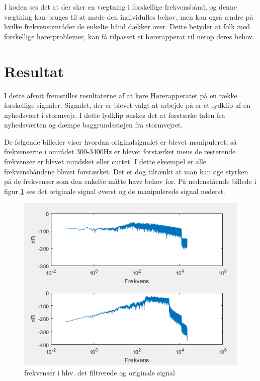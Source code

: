 I koden ses det at der sker en vægtning i forskellige frekvensbånd, og denne vægtning kan bruges til at møde den individulles behov, men kan også ændre på hvilke frekvensområder de enkelte bånd dækker over. Dette betyder at folk med forskellige hørerproblemer, kan få tilpasset et hørerapperat til netop deres behov.

\newpage
\section{Resultat}
I dette afsnit fremstilles resultaterne af at køre Hørerapperatet på en række forskellige signaler. Signalet, der er blevet valgt at arbejde på er et lydklip af en nyhedsvært i stormvejr. I dette lydklip ønskes det at forstærke talen fra nyhedsværten og dæmpe baggrundsstøjen fra stormvejret.


De følgende billeder viser hvordan originalsignalet er blevet manipuleret, så frekvenserne i området 300-3400Hz er blevet forstærket mens de resterende frekvenser er blevet mindsket eller cuttet.   
I dette eksempel er alle frekvensbåndene blevet forstærket. Det er dog tiltænkt at man kan øge styrken på de frekvenser som den enkelte måtte have behov for. På nedenstående billede i figur \ref*{fig:Samlet frekvensplot} ses det originale signal øverst og de manipulerede signal nederst.


\begin{figure}[H]
	\centering
	\includegraphics[width=150mm]{figures/hoereapparat_resultat.PNG}
	\caption{frekvenser i hhv. det filtrerede og originale signal}
	\label{fig:Samlet frekvensplot}
\end{figure}


